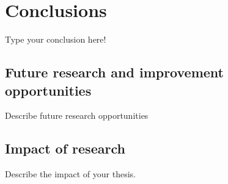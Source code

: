 \chapter{Conclusions} \label{ch:conclusion}

Type your conclusion here!

\section{Future research and improvement opportunities}
Describe future research opportunities\\

\section{Impact of research}
Describe the impact of your thesis.
